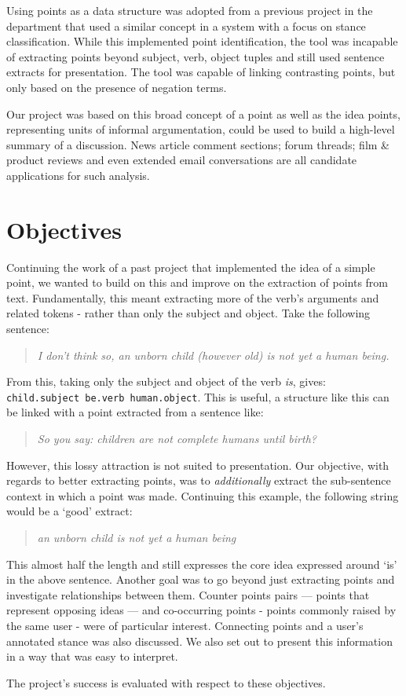     Using points as a data structure was adopted from a previous project in the department that used a similar concept in a system with a focus on stance classification. While this implemented point identification, the tool was incapable of extracting points beyond subject, verb, object tuples and still used sentence extracts for presentation. The tool was capable of linking contrasting points, but only based on the presence of negation terms.

    Our project was based on this broad concept of a point as well as the idea points, representing units of informal argumentation, could be used to build a high-level summary of a discussion. News article comment sections; forum threads; film \& product reviews and even extended email conversations are all candidate applications for such analysis.

  \section{Objectives}
    Continuing the work of a past project that implemented the idea of a simple point, we wanted to build on this and improve on the extraction of points from text. Fundamentally, this meant extracting more of the verb's arguments and related tokens - rather than only the subject and object. Take the following sentence:

    \medskip
    \begin{center}
    \blockquote{\textit{I don't think so, an unborn child (however old) is not yet a human being.}}
    \end{center}
    \medskip

    From this, taking only the subject and object of the verb \textit{is}, gives: \texttt{child.subject be.verb human.object}. This is useful, a structure like this can be linked with a point extracted from a sentence like: \blockquote{\textit{So you say: children are not complete humans until birth?}}. However, this lossy attraction is not suited to presentation. Our objective, with regards to better extracting points, was to \textit{additionally} extract the sub-sentence context in which a point was made. Continuing this example, the following string would be a `good' extract:

    \medskip
    \begin{center}
    \blockquote{\textit{an unborn child is not yet a human being}}
    \end{center}
    \medskip

    This almost half the length and still expresses the core idea expressed around `is' in the above sentence. Another goal was to go beyond just extracting points and investigate relationships between them. Counter points pairs --- points that represent opposing ideas --- and co-occurring points - points commonly raised by the same user - were of particular interest. Connecting points and a user's annotated stance was also discussed. We also set out to present this information in a way that was easy to interpret.

    \medskip

    The project's success is evaluated with respect to these objectives.
